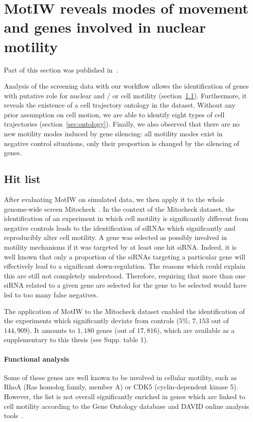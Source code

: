 \section{MotIW reveals modes of movement and genes involved in nuclear
motility}
\label{sec:mitocheck}
Part of this section was published in~\cite{motiw}.

Analysis of the screening data with our workflow allows the
identification of genes with putative role for nuclear and / or cell
motility (section~\ref{sec:hitlist}). Furthermore, it reveals the existence of
a cell trajectory ontology in the dataset. Without any prior
assumption on cell motion, we are able to identify eight types of cell
trajectories (section~\ref{sec:ontology}). Finally, we also observed
that there are no new motility modes induced by gene silencing: all
motility modes exist in negative control situations, only their
proportion is changed by the silencing of genes. 

\subsection{Hit list}
\label{sec:hitlist}
After evaluating MotIW on simulated data, we then apply it to the
whole genome-wide screen Mitocheck~\cite{pmid20360735}. In the context
of the Mitocheck dataset, the identification of an experiment in which
cell motility is significantly different from negative controls leads
to the identification of siRNAs which significantly and reproducibly
alter cell motility. A gene was selected as possibly involved in
motility mechanisms if it was targeted by at least one hit
siRNA. Indeed, it is well known that only a proportion of the siRNAs
targeting a particular gene will effectively lead to a significant
down-regulation. 
The reasons which could explain this are still not completely
understood. Therefore, requiring that more than one siRNA related to a
given gene are selected for the gene to be selected would have led to
too many false negatives.

The application of MotIW to the Mitocheck dataset enabled the identification of the experiments which significantly deviate from controls ($5\%$; $7,153$ out of $144,909$). It amounts to $1,180$ genes (out of $17,816$), which are available as a supplementary to this thesis (see Supp. table 1).%


\paragraph{Functional analysis} Some of these genes are well known to
be involved in cellular motility, such as RhoA (Ras homolog family,
member A) or CDK5 (cyclin-dependent kinase 5). However, the list is
not overall significantly enriched in genes which are linked to cell
motility according to the Gene Ontology database and DAVID online
analysis tools~\cite{pmid22543366}.  


